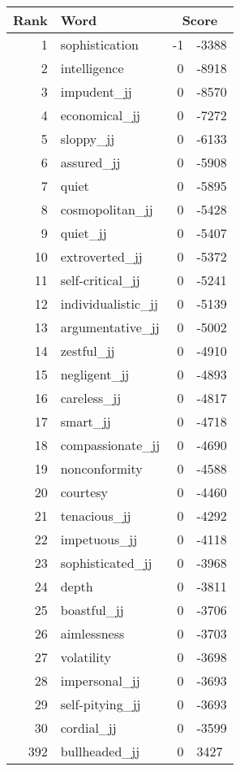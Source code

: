 \begin{longtable}[!htbp]{| rlr@{.}l |}
    \hline
    \textbf{Rank} & \textbf{Word} & \multicolumn{2}{c|}{\textbf{Score}} \\
    \hline
    \endhead
    1 & sophistication & -1 & -3388 \\
    2 & intelligence & 0 & -8918 \\
    3 & impudent\_jj & 0 & -8570 \\
    4 & economical\_jj & 0 & -7272 \\
    5 & sloppy\_jj & 0 & -6133 \\
    6 & assured\_jj & 0 & -5908 \\
    7 & quiet & 0 & -5895 \\
    8 & cosmopolitan\_jj & 0 & -5428 \\
    9 & quiet\_jj & 0 & -5407 \\
    10 & extroverted\_jj & 0 & -5372 \\
    11 & self-critical\_jj & 0 & -5241 \\
    12 & individualistic\_jj & 0 & -5139 \\
    13 & argumentative\_jj & 0 & -5002 \\
    14 & zestful\_jj & 0 & -4910 \\
    15 & negligent\_jj & 0 & -4893 \\
    16 & careless\_jj & 0 & -4817 \\
    17 & smart\_jj & 0 & -4718 \\
    18 & compassionate\_jj & 0 & -4690 \\
    19 & nonconformity & 0 & -4588 \\
    20 & courtesy & 0 & -4460 \\
    21 & tenacious\_jj & 0 & -4292 \\
    22 & impetuous\_jj & 0 & -4118 \\
    23 & sophisticated\_jj & 0 & -3968 \\
    24 & depth & 0 & -3811 \\
    25 & boastful\_jj & 0 & -3706 \\
    26 & aimlessness & 0 & -3703 \\
    27 & volatility & 0 & -3698 \\
    28 & impersonal\_jj & 0 & -3693 \\
    29 & self-pitying\_jj & 0 & -3693 \\
    30 & cordial\_jj & 0 & -3599 \\
    392 & bullheaded\_jj & 0 & 3427 \\

\end{longtable}
